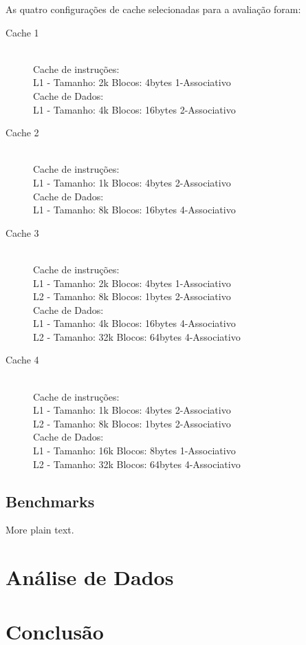\documentclass[pdftex,12pt,a4paper]{article}
\begin{document}
As quatro configurações de cache selecionadas para a avaliação foram:

\begin{description}
\item[Cache 1] \hfill \\
Cache de instruções:\\
L1 - Tamanho: 2k Blocos: 4bytes 1-Associativo\\
Cache de Dados:\\
L1 - Tamanho: 4k Blocos: 16bytes 2-Associativo
\item[Cache 2] \hfill \\
Cache de instruções:\\
L1 - Tamanho: 1k Blocos: 4bytes 2-Associativo\\
Cache de Dados:\\
L1 - Tamanho: 8k Blocos: 16bytes 4-Associativo
\item[Cache 3] \hfill \\
Cache de instruções:\\
L1 - Tamanho: 2k Blocos: 4bytes 1-Associativo\\
L2 - Tamanho: 8k Blocos: 1bytes 2-Associativo\\
Cache de Dados:\\
L1 - Tamanho: 4k Blocos: 16bytes 4-Associativo\\
L2 - Tamanho: 32k Blocos: 64bytes 4-Associativo
\item[Cache 4] \hfill \\
Cache de instruções:\\
L1 - Tamanho: 1k Blocos: 4bytes 2-Associativo\\
L2 - Tamanho: 8k Blocos: 1bytes 2-Associativo\\
Cache de Dados:\\
L1 - Tamanho: 16k Blocos: 8bytes 1-Associativo\\
L2 - Tamanho: 32k Blocos: 64bytes 4-Associativo
\end{description}

\subsection{Benchmarks}

More plain text.

\section{Análise de Dados}

\section{Conclusão}
\end{document}
